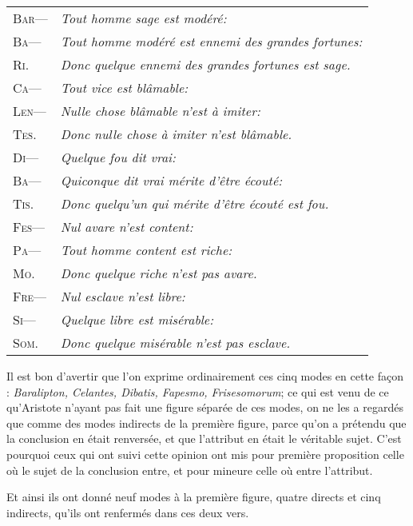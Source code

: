 	\begin{tabularx}{\textwidth}{lX}
		{\scshape\large Bar—} & \emph{Tout homme sage est modéré:} \\
		{\scshape\large Ba— } & \emph{Tout homme modéré est ennemi des grandes fortunes:} \\
		{\scshape\large Ri. } & \emph{Donc quelque ennemi des grandes fortunes est sage.} \\
		{\scshape\large Ca— } & \emph{Tout vice est blâmable:} \\
		{\scshape\large Len—} & \emph{Nulle chose blâmable n'est à imiter:} \\
		{\scshape\large Tes.} & \emph{Donc nulle chose à imiter n'est blâmable.} \\
		{\scshape\large Di— } & \emph{Quelque fou dit vrai:} \\
		{\scshape\large Ba— } & \emph{Quiconque dit vrai mérite d'être écouté:} \\
		{\scshape\large Tis.} & \emph{Donc quelqu'un qui mérite d'être écouté est fou.} \\
		{\scshape\large Fes—} & \emph{Nul avare n'est content:} \\
		{\scshape\large Pa— } & \emph{Tout homme content est riche:} \\
		{\scshape\large Mo. } & \emph{Donc quelque riche n'est pas avare.} \\
		{\scshape\large Fre—} & \emph{Nul esclave n'est libre:} \\
		{\scshape\large Si— } & \emph{Quelque libre est misérable:} \\
		{\scshape\large Som.} & \emph{Donc quelque misérable n'est pas esclave.} \\
	\end{tabularx}

Il est bon d'avertir que l'on exprime ordinairement ces cinq modes en cette façon : \emph{Baralipton, Celantes, Dibatis, Fapesmo, Frisesomorum}; ce qui est venu de ce qu'Aristote n'ayant pas fait une figure séparée de ces modes, on ne les a regardés que comme des modes indirects de la première figure, parce qu'on a prétendu que la conclusion en était renversée, et que l'attribut en était le véritable sujet. C'est pourquoi ceux qui ont suivi cette opinion ont mis pour première proposition celle où le sujet de la conclusion entre, et pour mineure celle où entre l'attribut.

Et ainsi ils ont donné neuf modes à la première figure, quatre directs et cinq indirects, qu'ils ont renfermés dans ces deux vers.

